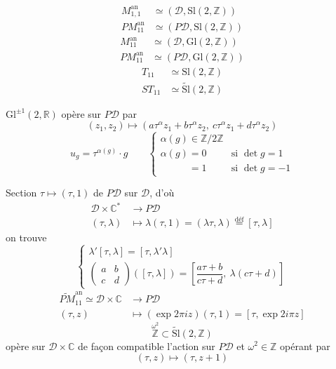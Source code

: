 \documentclass[11pt,a4paper]{article}
\begin{document}
\begin{align*}
  M_{1,1}^{\mathrm{an}} &\simeq (\mathcal{D}, \mathrm{Sl}(2, \mathbb{Z})) \\
  PM_{11}^{\mathrm{an}} &\simeq (P\mathcal{D}, \mathrm{Sl}(2, \mathbb{Z}))
\end{align*}
\begin{align*}
  M_{11}^{\mathrm{an}} &\simeq (\mathcal{D}, \mathrm{Gl}(2, \mathbb{Z})) \\
  PM_{11}^{\mathrm{an}} &\simeq (P\mathcal{D}, \mathrm{Gl}(2, \mathbb{Z}))
\end{align*}
\begin{align*}
  T_{11} &\simeq \mathrm{Sl}(2, \mathbb{Z}) \\
  ST_{11} &\simeq \widetilde{\mathrm{Sl}}(2, \mathbb{Z})
\end{align*}

$\mathrm{Gl}^{\pm 1}(2, \mathbb{R})$ opère sur $P\mathcal{D}$ par
\[
  (z_{1}, z_{2}) \mapsto (a\tau^{\alpha}z_{1} + b\tau^{\alpha}z_{2},\ c\tau^{\alpha}z_{1} + d\tau^{\alpha}z_{2})
\]
\[
  u_{g} = \tau^{\alpha(g)} \cdot g \qquad
  \begin{cases}
    \alpha(g) \in \mathbb{Z}/2\mathbb{Z} \\
    \alpha(g) = 0 & \text{si } \det g = 1 \\
    \phantom{\alpha(g)} = 1 & \text{si } \det g = -1
  \end{cases}
\]

Section $\tau \mapsto (\tau, 1)$ de $P\mathcal{D}$ sur $\mathcal{D}$, d'où 
\begin{align*}
  \mathcal{D} \times \mathbb{C}^{*} &\to P\mathcal{D} \\
  (\tau, \lambda) &\mapsto \lambda(\tau, 1) = (\lambda\tau, \lambda) \overset{\text{déf}}{=} [\tau, \lambda]
\end{align*}
on trouve
\[
  \begin{cases}
    \lambda'[\tau, \lambda] = [\tau, \lambda'\lambda] \\
    \begin{pmatrix} a & b \\ c & d \end{pmatrix}([\tau, \lambda]) = \left[\dfrac{a\tau + b}{c\tau + d},\ \lambda(c\tau + d)\right]
  \end{cases}
\]
\begin{align*}
  \widetilde{PM}_{11}^{\mathrm{an}} \simeq \mathcal{D} \times \mathbb{C} &\to P\mathcal{D} \\
  (\tau, z) &\mapsto (\exp 2\pi i z)(\tau, 1) = [\tau, \exp 2i\pi z]
\end{align*}
\[
  \overset{\omega^{2}}{\mathbb{Z}} \subset \widetilde{\mathrm{Sl}}(2, \mathbb{Z})
\]
opère sur $\mathcal{D} \times \mathbb{C}$ de façon compatible  l'action sur $P\mathcal{D}$ et $\omega^{2} \in \mathbb{Z}$ opérant par
\[
  (\tau, z) \mapsto (\tau, z + 1)
\]
\end{document}
